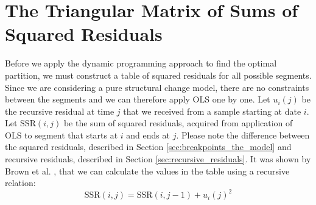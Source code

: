 \documentclass[main.tex]{subfiles}
\begin{document}
\section{The Triangular Matrix of Sums of Squared Residuals}
\label{sec:triangular_matrix}
Before we apply the dynamic programming approach to find the optimal
partition, we must construct a table of squared residuals for all possible
segments. Since we are considering a pure
structural change model, there are no constraints between the segments and we
can therefore apply OLS one by one. Let $u_i(j)$ be the recursive residual at
time $j$ that we received from a sample starting at date $i$.
Let $\text{SSR}(i, j)$  be the sum of squared residuals, acquired from
application of OLS to segment that starts at $i$ and ends at $j$.
Please note the difference between the squared residuals, described in Section
\ref{sec:breakpoints_the_model} and recursive residuals, described in Section
\ref{sec:recursive_residuals}. 
It was shown by Brown et al. \cite{brown75}, that we can calculate the values in
the table using a recursive relation:
\[
\text{SSR}(i,j) = \text{SSR}(i, j - 1) + u_i(j)^2
\]

\end{document}
